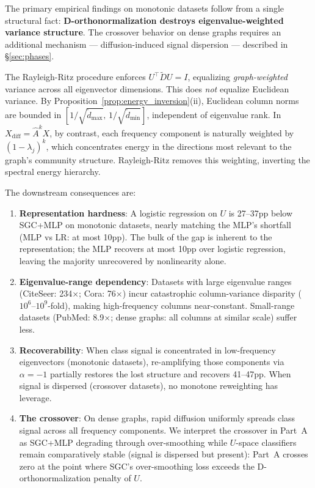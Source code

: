 \documentclass[11pt]{article}
\begin{document}
The primary empirical findings on monotonic datasets follow from a single structural fact:
\textbf{D-orthonormalization destroys eigenvalue-weighted variance structure}.
The crossover behavior on dense graphs requires an additional mechanism ---
diffusion-induced signal dispersion --- described in \S\ref{sec:phases}.

The Rayleigh-Ritz procedure enforces $U^\top \tilde{D} U = I$,
equalizing \emph{graph-weighted} variance across all eigenvector dimensions.
This does \emph{not} equalize Euclidean variance.
By Proposition~\ref{prop:energy_inversion}(ii), Euclidean column norms are
bounded in $[1/\sqrt{\tilde{d}_{\max}},\, 1/\sqrt{\tilde{d}_{\min}}]$,
independent of eigenvalue rank.
In $X_{\mathrm{diff}} = \hat{A}^k X$, by contrast, each frequency component is
naturally weighted by $(1{-}\lambda_j)^k$, which concentrates energy in the
directions most relevant to the graph's community structure.
Rayleigh-Ritz removes this weighting, inverting the spectral energy hierarchy.

The downstream consequences are:
\begin{enumerate}
  \item \textbf{Representation hardness}: A logistic regression on $U$ is
    27--37pp below SGC+MLP on monotonic datasets, nearly matching the MLP's
    shortfall (MLP vs LR: at most 10pp).  The bulk of the gap is inherent to
    the representation; the MLP recovers at most 10pp over logistic regression,
    leaving the majority unrecovered by nonlinearity alone.
  \item \textbf{Eigenvalue-range dependency}: Datasets with large eigenvalue ranges
    (CiteSeer: 234$\times$; Cora: 76$\times$) incur catastrophic column-variance
    disparity ($10^6$--$10^9$-fold), making high-frequency columns near-constant.
    Small-range datasets (PubMed: 8.9$\times$; dense graphs: all columns at similar
    scale) suffer less.
  \item \textbf{Recoverability}: When class signal is concentrated in low-frequency
    eigenvectors (monotonic datasets), re-amplifying those components via
    $\alpha{=}-1$ partially restores the lost structure and recovers 41--47pp.
    When signal is dispersed (crossover datasets), no monotone reweighting has leverage.
  \item \textbf{The crossover}: On dense graphs, rapid diffusion uniformly spreads
    class signal across all frequency components.  We interpret the crossover in
    Part~A as SGC+MLP degrading through over-smoothing while $U$-space classifiers
    remain comparatively stable (signal is dispersed but present): Part~A crosses
    zero at the point where SGC's over-smoothing loss exceeds the
    D-orthonormalization penalty of $U$.
\end{enumerate}
\end{document}
